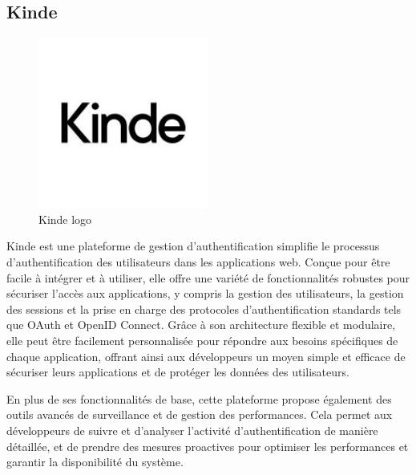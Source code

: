 \documentclass[a4paper,12pt]{report}
\numberwithin{equation}{section}
\begin{document}
\subsection{Kinde}
\begin{figure}[H]
    \centering
    \includegraphics[width=0.5\textwidth]{tech/kinde.jpeg}
    \caption{Kinde logo}
    \label{fig:Kinde logo}
\end{figure}
\par
Kinde est une plateforme de gestion d'authentification simplifie le processus d'authentification des utilisateurs dans les applications web. Conçue pour être facile à intégrer et à utiliser, elle offre une variété de fonctionnalités robustes pour sécuriser l'accès aux applications, y compris la gestion des utilisateurs, la gestion des sessions et la prise en charge des protocoles d'authentification standards tels que OAuth et OpenID Connect. Grâce à son architecture flexible et modulaire, elle peut être facilement personnalisée pour répondre aux besoins spécifiques de chaque application, offrant ainsi aux développeurs un moyen simple et efficace de sécuriser leurs applications et de protéger les données des utilisateurs.
\\ \par
En plus de ses fonctionnalités de base, cette plateforme propose également des outils avancés de surveillance et de gestion des performances. Cela permet aux développeurs de suivre et d'analyser l'activité d'authentification de manière détaillée, et de prendre des mesures proactives pour optimiser les performances et garantir la disponibilité du système.

\newpage
\end{document}
